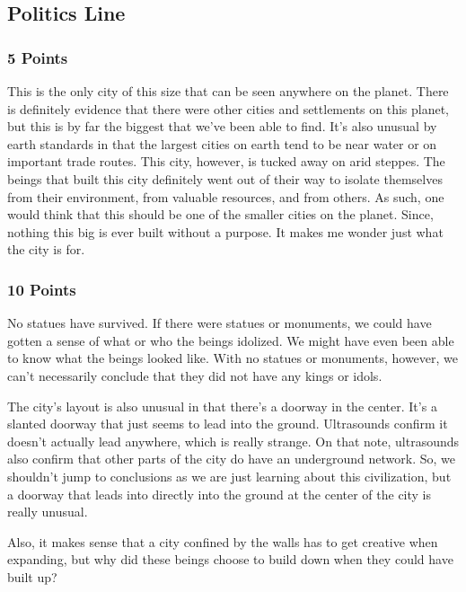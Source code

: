 \documentclass[conference]{IEEEtran}
\begin{document}
\subsection{Politics Line}

\subsubsection*{5 Points}
This is the only city of this size that can be seen anywhere on the planet. There is definitely evidence that there were other cities and settlements on this planet, but this is by far the biggest that we’ve been able to find. It’s also unusual by earth standards in that the largest cities on earth tend to be near water or on important trade routes. This city, however, is tucked away on arid steppes. The beings that built this city definitely went out of their way to isolate themselves from their environment, from valuable resources, and from others. As such, one would think that this should be one of the smaller cities on the planet. Since, nothing this big is ever built without a purpose. It makes me wonder just what the city is for.

\subsubsection*{10 Points}
No statues have survived. If there were statues or monuments, we could have gotten a sense of what or who the beings idolized. We might have even been able to know what the beings looked like. With no statues or monuments, however, we can’t necessarily conclude that they did not have any kings or idols. 

The city’s layout is also unusual in that there’s a doorway in the center. It’s a slanted doorway that just seems to lead into the ground. Ultrasounds confirm it doesn’t actually lead anywhere, which is really strange. On that note, ultrasounds also confirm that other parts of the city do have an underground network. So, we shouldn’t  jump to conclusions as we are just learning about this civilization, but a doorway that leads into directly into the ground at the center of the city is really unusual.

Also, it makes sense that a city confined by the walls has to get creative when expanding, but why did these beings choose to build down when they could have built up?
\end{document}
